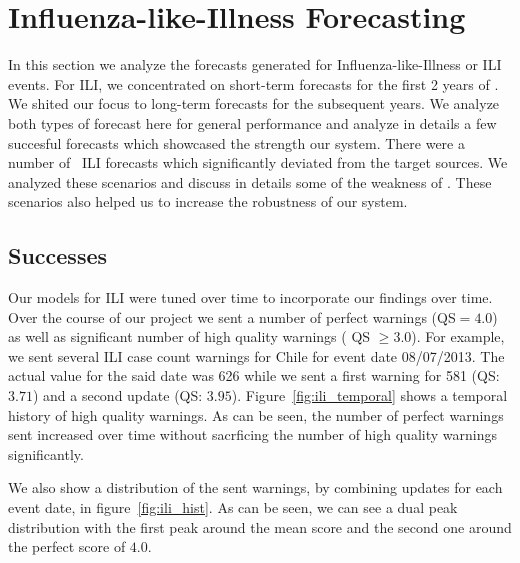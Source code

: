 \section{Influenza-like-Illness Forecasting}
In this section we analyze the forecasts generated for Influenza-like-Illness
or ILI events. For ILI, we concentrated on short-term forecasts for the first 
2 years of \EMBERS. We shited our focus to long-term forecasts for the subsequent
years. We analyze both types of forecast here for general performance and 
analyze in details a few succesful forecasts which showcased the strength 
our system. There were a number of \EMBERS~ILI forecasts which significantly
deviated from the target sources. We analyzed these scenarios and discuss in 
details some of the weakness of \EMBERS. These scenarios also helped us to 
increase the robustness of our system.


\subsection{Successes}
Our models for ILI were tuned over time to incorporate our findings over time. 
Over the course of our project we sent a number of perfect warnings (QS$=4.0$) 
as well as significant number of high quality warnings ( QS $\geq 3.0$). For 
example, we sent several ILI case count warnings for Chile for event date
08/07/2013. The actual value for the said date was 626 while we sent a first 
warning for 581 (QS: $3.71$) and a second update (QS: $3.95$).
Figure~\ref{fig:ili_temporal} shows a temporal history of high quality warnings.
As can be seen, the number of perfect warnings sent increased over time without
sacrficing the number of high quality warnings significantly. 

We also show a distribution of the sent warnings, by combining updates for 
each event date, in figure~\ref{fig:ili_hist}. As can be seen, we can see a 
dual peak distribution with the first peak around the mean score and the second
one around the perfect score of $4.0$.


